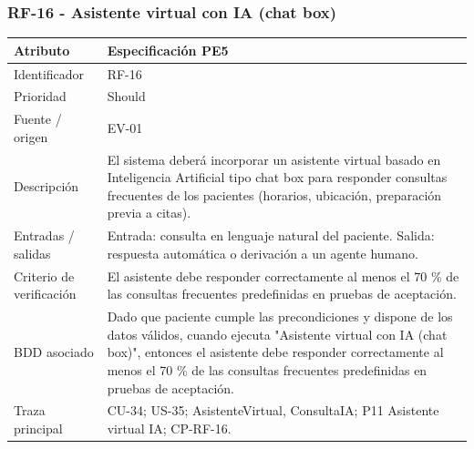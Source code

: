 \documentclass[11pt,a4paper]{article}
\begin{document}
	\subsubsection{RF-16 - Asistente virtual con IA (chat box)}
	\begin{tabularx}{\textwidth}{p{3.2cm}Y}
		\toprule
		\textbf{Atributo} & \textbf{Especificación PE5}\\\midrule
		Identificador & RF-16\\
		Prioridad & Should\\
		Fuente / origen & EV-01\\
		Descripción & El sistema deberá incorporar un asistente virtual basado en Inteligencia Artificial tipo chat box para responder consultas frecuentes de los pacientes (horarios, ubicación, preparación previa a citas).\\
		Entradas / salidas & Entrada: consulta en lenguaje natural del paciente. Salida: respuesta automática o derivación a un agente humano.\\
		Criterio de verificación & El asistente debe responder correctamente al menos el 70 \% de las consultas frecuentes predefinidas en pruebas de aceptación.\\
		BDD asociado & Dado que paciente cumple las precondiciones y dispone de los datos válidos, cuando ejecuta "Asistente virtual con IA (chat box)", entonces el asistente debe responder correctamente al menos el 70 \% de las consultas frecuentes predefinidas en pruebas de aceptación.\\
		Traza principal & CU-34; US-35; AsistenteVirtual, ConsultaIA; P11 Asistente virtual IA; CP-RF-16.\\
		\bottomrule
	\end{tabularx}
	\clearpage
\end{document}
